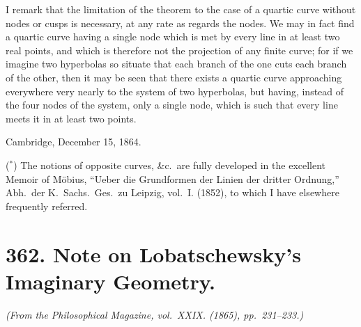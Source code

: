 \documentclass[11pt,a4paper]{article}
\theoremstyle{plain}
\begin{document}
I remark that the limitation of the theorem to the case of a quartic curve without nodes or cusps is necessary, at any rate as regards the nodes. We may in fact find a quartic curve having a single node which is met by every line in at least two real points, and which is therefore not the projection of any finite curve; for if we imagine two hyperbolas so situate that each branch of the one cuts each branch of the other, then it may be seen that there exists a quartic curve approaching everywhere very nearly to the system of two hyperbolas, but having, instead of the four nodes of the system, only a single node, which is such that every line meets it in at least two points.

\begin{flushright}
Cambridge, December 15, 1864.
\end{flushright}

\vspace{0.5cm}
\noindent($^*$) The notions of opposite curves, \&c.\ are fully developed in the excellent Memoir of M\"{o}bius, ``Ueber die Grundformen der Linien der dritter Ordnung,'' Abh.\ der K.\ Sachs.\ Ges.\ zu Leipzig, vol.~I. (1852), to which I have elsewhere frequently referred.

\vspace{1cm}

\section*{362. Note on Lobatschewsky's Imaginary Geometry.\quad [362]}
\label{sec:362}

\begin{flushright}
\textit{(From the Philosophical Magazine, vol.~XXIX. (1865), pp.~231--233.)}
\end{flushright}
\end{document}
